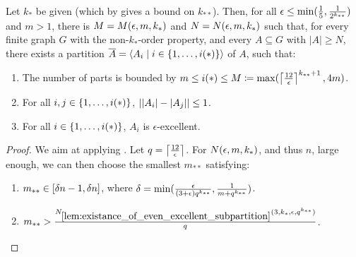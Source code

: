         \begin{theorem} \label{thm:minimal_conditions_for_excellent_partitions}
            Let $k_*$ be given (which by  gives a bound on $k_{**}$).
            Then, for all $\epsilon \leq \min ( \frac{1}{5}, \frac{1}{2^{k_{**}}} )$ and $m > 1$, there is $M = M( \epsilon, m, k_* )$
            and $N = N( \epsilon, m, k_* )$ such that, for every finite graph $G$ with the non-$k_{*}$-order property, and
            every $A \subseteq G$ with $|A| \geq N$, there exists a partition $\overline{A} = \left< A_i \mid i \in \{ 1, \dots, i(*) \} \right>$
            of $A$, such that:
            \begin{enumerate}
                \item \label{itm:minimal_conditions_for_excellent_partitions.0} The number of parts is bounded by
                    $m \leq i(*) \leq M \coloneqq \max ( \left\lceil \frac{12}{\epsilon} \right\rceil^{k_{**}+1}, 4m )$.
                \item \label{itm:minimal_conditions_for_excellent_partitions.1}
                    For all $i, j \in \{ 1, \dots, i(*) \}$, $| | A_i |- | A_j | | \leq 1$.
                \item \label{itm:minimal_conditions_for_excellent_partitions.2}
                    For all $i \in \{ 1, \dots, i(*) \}$, $A_i$ is $\epsilon$-excellent.
            \end{enumerate}
            \begin{proof}
                We aim at applying .
                Let $q = \left\lceil \frac{12}{\epsilon} \right\rceil$.
                For $N( \epsilon, m, k_* )$, and thus $n$, large enough, we can then choose the smallest $m_{**}$ satisfying:
                \begin{enumerate}[label=(\alph*), ref=\alph*]
                    \item \label{itm:minimal_conditions_for_excellent_partitions.a} $m_{**} \in [ \delta n -1, \delta n ]$, where
                        $\delta = \min ( \frac{\epsilon}{( 3 + \epsilon ) q^{k_{**}}}, \frac{1}{m + q^{k_{**}}} )$.
                    \item \label{itm:minimal_conditions_for_excellent_partitions.c} $m_{**} > \frac{N_{\ref{lem:existance_of_even_excellent_subpartition}}
                        ( 3, k_*, \epsilon, q^{k_{**}} )}{q}$.

\end{enumerate}
\end{proof}
\end{theorem}
